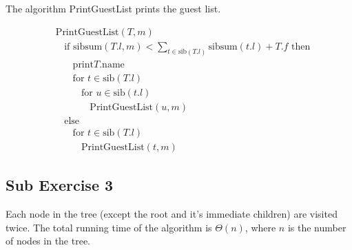 \documentclass[koma,a4paper]{article}
\begin{document}
The algorithm PrintGuestList prints the guest list.

\begin{align*}
  &\text{PrintGuestList}(T, m)\\
  &~~~~\text{if } \text{sibsum}(T.l, m) < \sum\limits_{t \in \text{sib}(T.l)}\text{sibsum}(t.l) + T.f \text{ then}\\
  &~~~~~~~~\text{print} T.\text{name}\\
  &~~~~~~~~\text{for } t \in \text{sib}(T.l)\\
  &~~~~~~~~~~~~\text{for } u \in \text{sib}(t.l)\\
  &~~~~~~~~~~~~~~~~\text{PrintGuestList}(u, m)\\
  &~~~~\text{else }\\
  &~~~~~~~~\text{for } t \in \text{sib}(T.l)\\
  &~~~~~~~~~~~~\text{PrintGuestList}(t, m)
\end{align*}

\subsection{Sub Exercise 3}
Each node in the tree (except the root and it's immediate children) are visited twice. The total running time of the algorithm is $\Theta(n)$, where $n$ is the number of nodes in the tree.
\end{document}
